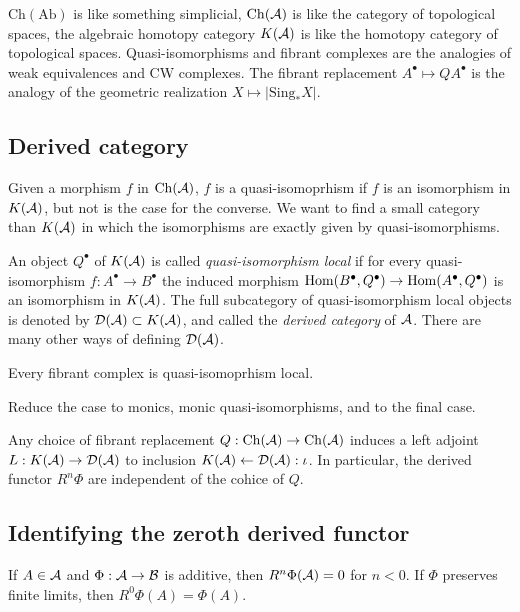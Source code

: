 \documentclass{../../../small}
\begin{document}
$\mathrm{Ch}(\mathrm{Ab})$ is like something simplicial, $\mathrm{Ch}(\mathcal{A})$ is like the category of topological spaces, the algebraic homotopy category $K(\mathcal{A})$ is like the homotopy category of topological spaces.
Quasi-isomorphisms and fibrant complexes are the analogies of weak equivalences and CW complexes.
The fibrant replacement $A^\bullet\mapsto QA^\bullet$ is the analogy of the geometric realization $X\mapsto|\mathrm{Sing}_*X|$.


\subsection{Derived category}

Given a morphism $f$ in $\mathrm{Ch}(\mathcal{A})$, $f$ is a quasi-isomoprhism if $f$ is an isomorphism in $K(\mathcal{A})$, but not is the case for the converse.
We want to find a small category than $K(\mathcal{A})$ in which the isomorphisms are exactly given by quasi-isomorphisms.

An object $Q^\bullet$ of $K(\mathcal{A})$ is called \emph{quasi-isomorphism local} if for every quasi-isomorphism $f:A^\bullet\to B^\bullet$ the induced morphism $\operatorname{Hom}(B^\bullet,Q^\bullet)\to\operatorname{Hom}(A^\bullet,Q^\bullet)$ is an isomorphism in $K(\mathcal{A})$.
The full subcategory of quasi-isomorphism local objects is denoted by $\mathcal{D}(\mathcal{A})\subset K(\mathcal{A})$, and called the \emph{derived category} of $\mathcal{A}$.
There are many other ways of defining $\mathcal{D}(\mathcal{A})$.


\begin{prop*}
Every fibrant complex is quasi-isomoprhism local.
\end{prop*}

Reduce the case to monics, monic quasi-isomorphisms, and to the final case.


\begin{cor*}
Any choice of fibrant replacement $Q:\mathrm{Ch}(\mathcal{A})\to\mathrm{Ch}(\mathcal{A})$ induces a left adjoint $L:K(\mathcal{A})\to\mathcal{D}(\mathcal{A})$ to inclusion $K(\mathcal{A})\leftarrow\mathcal{D}(\mathcal{A}):\iota$.
In particular, the derived functor $R^n\Phi$ are independent of the cohice of $Q$.
\end{cor*}



\subsection{Identifying the zeroth derived functor}
\begin{prop*}
If $A\in\mathcal{A}$ and $\Phi:\mathcal{A}\to\mathcal{B}$ is additive, then $R^n\Phi(\mathcal{A})=0$ for $n<0$.
If $\Phi$ preserves finite limits, then $R^0\Phi(A)=\Phi(A)$.
\end{prop*}
\end{document}

